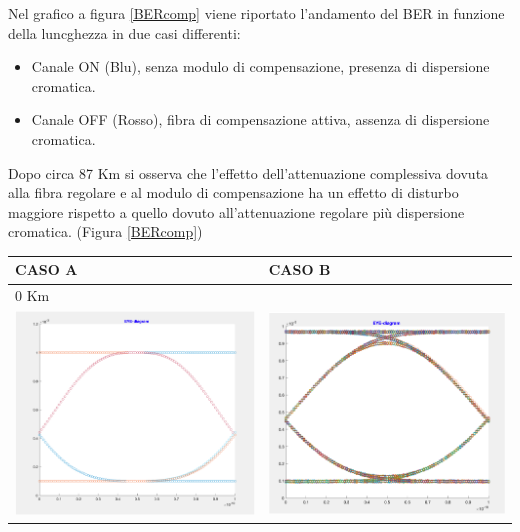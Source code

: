 \documentclass[12pt, a4paper]{article}
\begin{document}
Nel grafico a figura \ref{BERcomp} viene riportato l'andamento del BER in funzione della luncghezza in due casi differenti: 
\begin{itemize}
	\item Canale ON (Blu), senza modulo di compensazione, presenza di dispersione cromatica.
	\item Canale OFF (Rosso), fibra di compensazione attiva, assenza di dispersione cromatica.
\end{itemize}

Dopo circa 87 Km si osserva che l'effetto dell'attenuazione  complessiva dovuta alla fibra regolare e al modulo di compensazione ha un effetto di disturbo maggiore rispetto a quello dovuto all'attenuazione regolare più dispersione cromatica. (Figura \ref{BERcomp})

\newpage
\begin{table}[h!]
\centering
\begin{tabular}{ll}
\hline
CASO A & \multicolumn{1}{l}{CASO B} \\ \hline
0 Km   &                             \\ \hline
   \includegraphics[scale = 0.7]{OFF0.png}   &       \includegraphics[scale = 0.7]{ON0.png}                      \\ \hline

\end{tabular}
\end{table}
\end{document}

